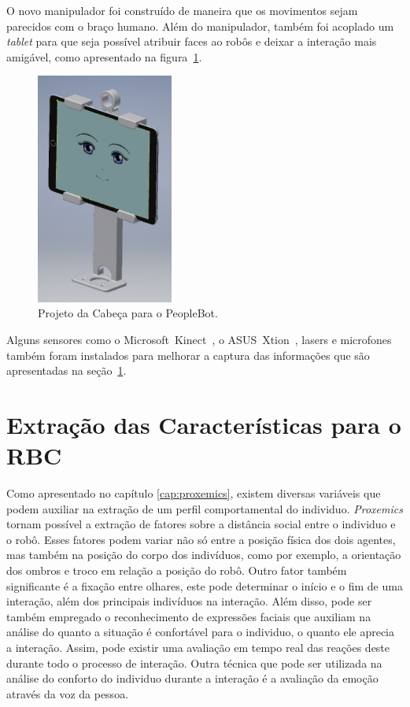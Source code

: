 O novo manipulador foi construído de maneira que os movimentos sejam parecidos com o braço humano. Além do manipulador, também foi acoplado um \emph{tablet} para que seja possível atribuir faces ao robôs e deixar a interação mais amigável, como apresentado na figura~\ref{fig:judithhead}.

\begin{figure}[ht!]
	\centering
	\includegraphics[width=0.4\textwidth]{images/judith_head.jpg}
	\caption{Projeto da Cabeça para o PeopleBot.}
	\label{fig:judithhead}
\end{figure}

Alguns sensores como o Microsoft\textregistered\ Kinect\textregistered\ , o ASUS\textregistered\ Xtion\textregistered\ , lasers e microfones também foram instalados para melhorar a captura das informações que são apresentadas na seção~\ref{sec:extracaocaracteristicas}.

\section{Extração das Características para o RBC}
\label{sec:extracaocaracteristicas}

Como apresentado no capítulo \ref{cap:proxemics}, existem diversas variáveis que podem auxiliar na extração de um perfil comportamental do individuo. \emph{Proxemics} tornam possível a extração de fatores sobre a distância social entre o individuo e o robô. Esses fatores podem variar não só entre a posição física dos dois agentes, mas também na posição do corpo dos indivíduos, como por exemplo, a orientação dos ombros e troco em relação a posição do robô. Outro fator também significante é a fixação entre olhares, este pode determinar o início e o fim de uma interação, além dos principais indivíduos na interação. Além disso, pode ser também empregado o reconhecimento de expressões faciais que auxiliam na análise do quanto a situação é confortável para o individuo, o quanto ele aprecia a interação. Assim, pode existir uma avaliação em tempo real das reações deste durante todo o processo de interação. Outra técnica que pode ser utilizada na análise do conforto do individuo durante a interação é a avaliação da emoção através da voz da pessoa.

